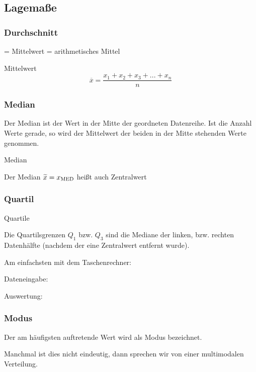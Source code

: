 \begin{multicols}{2}

\subsection{Lagemaße}
\subsubsection{Durchschnitt}
= Mittelwert = arithmetisches Mittel

\begin{definition}{Mittelwert}{}
$$\overline{x} = \frac{x_1 + x_2 + x_3 + ... + x_n}{n}$$
\end{definition}

\subsubsection{Median}
Der Median ist der Wert in der Mitte der geordneten Datenreihe. Ist
die Anzahl Werte gerade, so wird der Mittelwert der beiden in der
Mitte stehenden Werte genommen.
\begin{definition}{Median}{}

Der Median $\widetilde{x} = x_{\textrm{MED}}$ heißt auch Zentralwert
\end{definition}

\subsubsection{Quartil}

\begin{rezept}{Quartile}{}

Die Quartilsgrenzen $Q_1$ bzw. $Q_3$ sind die Mediane der linken,
bzw. rechten Datenhälfte (nachdem der eine Zentralwert entfernt
wurde).

Am einfachsten mit dem Taschenrechner:

Dateneingabe: 

Auswertung: 
\end{rezept}

\subsubsection{Modus}
Der am häufigsten auftretende Wert wird als Modus bezeichnet.

Manchmal ist dies nicht eindeutig, dann sprechen wir von einer
multimodalen Verteilung.


\end{multicols}
